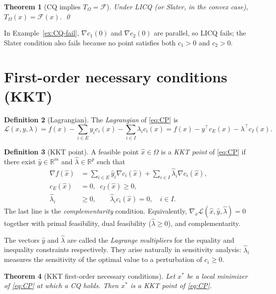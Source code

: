 \documentclass[11pt,a4paper]{report}
\theoremstyle{plain}
\newtheorem{theorem}{Theorem}[chapter]
\theoremstyle{definition}
\newtheorem{definition}[theorem]{Definition}
\newcommand{\R}{\mathbb{R}}
\newcommand{\grad}{\nabla}
\newcommand{\trans}{^{\top}}
\begin{document}
\begin{theorem}[CQ implies $T_{\Omega}=\mathcal{F}$]\label{thm:CQ}
Under LICQ (or Slater, in the convex case), $T_{\Omega}(x)=\mathcal{F}(x)$. \qed
\end{theorem}

In Example~\ref{ex:CQ-fail}, $\grad c_{1}(0)$ and $\grad c_{2}(0)$ are
parallel, so LICQ fails; the Slater condition also fails because no point
satisfies both $c_{1}>0$ and $c_{2}>0$.

\section{First-order necessary conditions (KKT)}

\begin{definition}[Lagrangian]
The \emph{Lagrangian} of \eqref{eq:CP} is
\[
\mathcal{L}(x,y,\lambda)=f(x)-\sum_{i\in E}y_{i}c_{i}(x)-\sum_{i\in I}\lambda_{i}c_{i}(x)
=f(x)-y\trans c_{E}(x)-\lambda\trans c_{I}(x).
\]
\end{definition}

\begin{definition}[KKT point]
A feasible point $\hat{x}\in\Omega$ is a \emph{KKT point} of \eqref{eq:CP} if
there exist $\hat{y}\in\R^{m}$ and $\hat{\lambda}\in\R^{p}$ such that
\begin{align*}
\grad f(\hat{x})&=\sum_{i\in E}\hat{y}_{i}\grad c_{i}(\hat{x})
                   +\sum_{i\in I}\hat{\lambda}_{i}\grad c_{i}(\hat{x}),\\
c_{E}(\hat{x})&=0,\;\;c_{I}(\hat{x})\ge 0,\\
\hat{\lambda}_{i}&\ge 0,\qquad\hat{\lambda}_{i}c_{i}(\hat{x})=0,\quad i\in I.
\end{align*}
The last line is the \emph{complementarity} condition. Equivalently,
$\grad_{x}\mathcal{L}(\hat{x},\hat{y},\hat{\lambda})=0$ together with primal
feasibility, dual feasibility ($\hat{\lambda}\ge 0$), and complementarity.
\end{definition}

The vectors $\hat{y}$ and $\hat{\lambda}$ are called the \emph{Lagrange
multipliers} for the equality and inequality constraints respectively. They
arise naturally in sensitivity analysis: $\hat{\lambda}_{i}$ measures the
sensitivity of the optimal value to a perturbation of $c_{i}\ge 0$.

\begin{theorem}[KKT first-order necessary conditions]\label{thm:KKT}
Let $x^{*}$ be a local minimizer of \eqref{eq:CP} at which a CQ holds. Then
$x^{*}$ is a KKT point of \eqref{eq:CP}.
\end{theorem}
\end{document}

